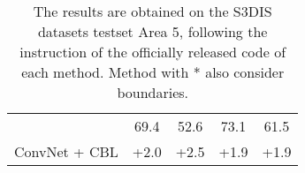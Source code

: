 \documentclass[10pt,twocolumn,letterpaper]{article}
\newcommand{\tly}{}
\begin{document}
\begin{table}
\begin{center}
{\begin{tabular}{r|ccc|c}
\hline
                                     & 69.4                         & 52.6                         & 73.1                         & 61.5                         \\
\multirow{-2}{*}{ConvNet + CBL}      & \cellcolor[HTML]{ECF4FF}+2.0 & \cellcolor[HTML]{ECF4FF}+2.5 & \cellcolor[HTML]{ECF4FF}+1.9 & \cellcolor[HTML]{ECF4FF}+1.9                                 \\
\hline
\end{tabular}
}\end{center}
\caption{The results are obtained on the S3DIS datasets testset Area 5, following the instruction of the officially released code of each method. {\tly Method with * also consider boundaries.}
}
\label{tbl:bound}
\end{table}
\end{document}
